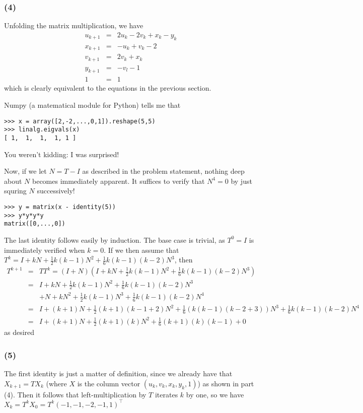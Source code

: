 \documentclass{article}
\begin{document}
\subsubsection{(4)}
Unfolding the matrix multiplication, we have
\begin{eqnarray*}
u_{k+1} &=&  2u_k - 2v_k + x_k - y_k\\
x_{k+1} &=& -u_k + v_k - 2\\
v_{k+1} &=&  2v_k + x_k\\
y_{k+1} &=&  -v_l - 1\\
1 &=&  1
\end{eqnarray*}
which is clearly equivalent to the equations in the previous section.

Numpy (a matematical module for Python) tells me that 
\begin{verbatim}
>>> x = array([2,-2,...,0,1]).reshape(5,5)
>>> linalg.eigvals(x)
[ 1,  1,  1,  1, 1 ]
\end{verbatim}
You weren't kidding: I was surprised!

Now, if we let $N = T - I$ as described in the problem statement, nothing deep about $N$ becomes immediately apparent. It suffices to verify that $N^4 = 0$ by just squring $N$ successively!

\begin{verbatim}
>>> y = matrix(x - identity(5))
>>> y*y*y*y
matrix([0,...,0])
\end{verbatim}

The last identity follows easily by induction. The base case is trivial, as $T^0 = I$ is immediately verified when $k = 0$.
If we then assume that $T^k = I + kN + \frac{1}{2}k(k-1)N^2 + \frac{1}{6}k(k-1)(k-2)N^3$, then
\begin{eqnarray*}
  T^{k+1} &=&  TT^k = (I + N)(I + kN + \frac{1}{2}k(k-1)N^2 + \frac{1}{6}k(k-1)(k-2)N^3)\\
  &=&  I + kN + \frac{1}{2}k(k-1)N^2 + \frac{1}{6}k(k-1)(k-2)N^3 \\
  && + N + kN^2 + \frac{1}{2}k(k-1)N^3 + \frac{1}{6}k(k-1)(k-2)N^4 \\
  &=& I + (k+1)N + \frac{1}{2}(k+1)(k-1 + 2)N^2 + \frac{1}{6}(k(k-1)(k - 2 + 3))N^3 + \frac{1}{6}k(k-1)(k-2)N^4\\
  &=& I + (k+1)N + \frac{1}{2}(k+1)(k)N^2 + \frac{1}{6}(k+1)(k)(k-1) + 0
\end{eqnarray*}
as desired

\subsubsection{(5)}
The first identity is just a matter of definition, since we already have that $X_{k+1} = T X_{k}$ (where $X$ is the column vector $(u_k, v_k, x_k, y_k, 1)$) as shown in part (4).
Then it follows that left-multiplication by $T$ iterates $k$ by one, so we have $X_{k} = T^k X_0 = T^k (-1,-1,-2,-1,1)^\top$
\end{document}
